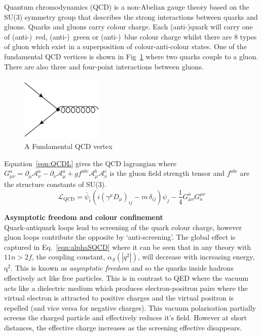 Quantum chromodynamics (QCD) is a non-Abelian gauge theory based on the SU(3) symmetry group that describes the strong interactions between quarks and gluons. Quarks and gluons carry colour charge. Each (anti-)quark will carry one of (anti-)~red, (anti-)~green or (anti-)~blue colour charge whilst there are 8 types of gluon which exist in a superposition of colour-anti-colour states. One of the fundamental QCD vertices is shown in Fig~\ref{fig:QCDvertex} where two quarks couple to a gluon. There are also three and four-point interactions between gluons.
\label{subsec:QCD}
\begin{figure}[ht!]
\begin{center}
    \includegraphics[width=0.35\textwidth]{images/Theory/QCDvertex.png}
    \caption{A Fundamental QCD vertex}
    \label{fig:QCDvertex}
\end{center}
\end{figure}


Equation~\ref{eqn:QCDL} gives the QCD lagrangian where $G_{\mu \nu }^{a}=\partial _{\mu }{\mathcal {A}}_{\nu }^{a}-\partial _{\nu }{\mathcal {A}}_{\mu }^{a}+gf^{abc}{\mathcal {A}}_{\mu }^{b}{\mathcal {A}}_{\nu }^{c}$ is the gluon field strength tensor and $f^{abc}$ are the structure constants of SU(3).
\begin{equation}
    \label{eqn:QCDL}
{\mathcal {L}}_{\mathrm {QCD} }={\bar {\psi }}_{i}\left(i(\gamma ^{\mu }D_{\mu })_{ij}-m\,\delta _{ij}\right)\psi _{j}-{\frac {1}{4}}G_{\mu \nu }^{a}G_{a}^{\mu \nu }
\end{equation}

\textbf{Asymptotic freedom and colour confinement}\\
Quark-antiquark loops lead to screening of the quark colour charge, however gluon loops contribute the opposite by `anti-screening'. The global effect is captured in Eq.~\ref{eqn:alphaSQCD} where it can be seen that in any theory with $11n>2f$, the coupling constant, $\alpha_{S}\left( |q^{2}| \right)$, will decrease with increasing energy, q$^{2}$. This is known as \emph{asymptotic freedom} and so the quarks inside hadrons effectively act like free particles. This is in contrast to QED where the vacuum acts like a dielectric medium which produces electron-positron pairs where the virtual electron is attracted to positive charges and the virtual positron is repelled (and vice versa for negative charges). This vacuum polarisation partially screens the charged particle and effectively reduces it's field. However at short distances, the effective charge increases as the screening effective disappears.

